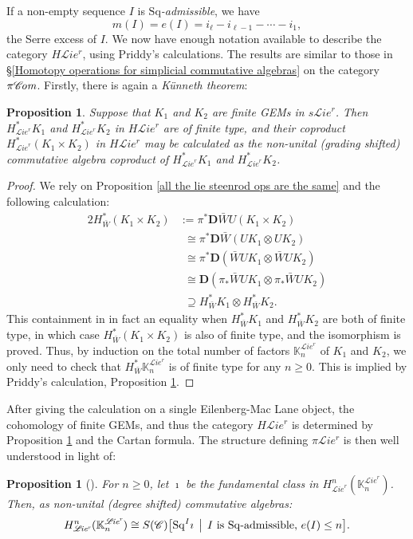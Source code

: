\documentclass[11pt]{amsart} \renewcommand{\baselinestretch}{1.2}
\theoremstyle{plain}
\newtheorem{prop}[thm]{Proposition}
\numberwithin{equation}{section} %
\theoremstyle{plain}
\newtheorem{prop}[thm]{Proposition}
\numberwithin{equation}{chapter} %
\newcommand{\scrL}{\mathscr{L}}
\newcommand{\scrC}{\mathscr{C}}
\newcommand{\citeBOX}[2][]{\cite[\mbox{#1}]{#2}}
\newcommand{\CommOperad}{{\scrC}}
\newcommand{\PA}[1]{\pi#1}
\newcommand{\HA}[1]{H#1}
\newcommand{\minDimDelta}{m}
\newcommand{\Sq}{\mathrm{Sq}}
\newcommand{\algs}{{\scrC\!\textit{\normalfont\textit{om}}}}
\newcommand{\restliealgs}{{\scrL\!\textit{ie}^\textit{r}}}
\newcommand{\dual}{\mathbf{D}}
\begin{document}
\begin{Constructing cohomology operations}
If a non-empty sequence $I$  is \emph{$\Sq$-admissible}, we have 
\[\minDimDelta(I)=e(I)=i_\ell-i_{\ell-1}-\cdots -i_1,\]
the Serre excess of $I$. We now have enough notation available to describe the category $\HA{\restliealgs}$, using Priddy's calculations. The results are similar to those in \S\ref{Homotopy operations for simplicial commutative algebras} on the category $\PA{\algs}$.
Firstly, there is again  a \emph{K\"unneth theorem}:
\begin{prop}
\label{Prop on cohomology of product of finite lie gems}
Suppose that $K_1$ and $K_2$ are finite GEMs in $s\restliealgs$. Then $H^*_\restliealgs K_1$ and $H^*_\restliealgs K_2$ in $\HA{\restliealgs}$ are of finite type, and their coproduct
$H^*_\restliealgs(K_1\times K_2)$ in $\HA{\restliealgs}$ may be calculated as the non-unital (grading shifted) commutative algebra coproduct of $H^*_\restliealgs K_1$ and $H^*_\restliealgs K_2$.
\end{prop}
\begin{proof}
We rely on Proposition \ref{all the lie steenrod ops are the same} and the following calculation:
\begin{alignat*}{2}
H^*_{\bar{W}}(K_1\times K_2)
&:=
\pi^*\dual \bar{W}U(K_1\times K_2)%
\\
&\phantom{:}\cong
\pi^*\dual \bar{W}(UK_1\otimes UK_2)%
\\
&\phantom{:}\cong
\pi^*\dual (\bar{W}UK_1\otimes \bar{W}UK_2)%
\\
&\phantom{:}\cong
\dual (\pi_*\bar{W}UK_1\otimes \pi_*\bar{W}UK_2)%
\\
&\phantom{:}\supseteq
H^*_{\bar{W}}K_1\otimes H^*_{\bar{W}}K_2.
\end{alignat*}
This containment in in fact an equality when $H^*_{\bar{W}}K_1 $ and $H^*_{\bar{W}}K_2$ are both of finite type, in which case $H^*_{\bar{W}}(K_1\times K_2)$ is also of finite type, and the isomorphism is proved. Thus, by induction on the total number of factors $\mathbb{K}_n^{\restliealgs}$ of $K_1$ and $K_2$, we only need to check that $H^*_{\bar{W}}\mathbb{K}_n^{\restliealgs}$ is of finite type for any $n\geq0$. This is implied by Priddy's calculation, Proposition \ref{calc of restliecoh on single EMobject}.
\end{proof}
\noindent After giving the calculation on a single Eilenberg-Mac Lane object, the cohomology of finite GEMs, and thus the category $\HA{\restliealgs}$ is determined by Proposition \ref{Prop on cohomology of product of finite lie gems} and the Cartan formula. The structure defining $\PA{\restliealgs}$ is then well understood in light of:
\begin{prop}[{\citeBOX[6.1]{PriddySimplicialLie.pdf}}]
\label{calc of restliecoh on single EMobject}
For $n\geq0$, let $\imath$ be the fundamental class in $H^n_{\restliealgs}(\mathbb{K}_n^{\restliealgs})$. Then, as non-unital (degree shifted) commutative algebras:
\[H^n_{\restliealgs}(\mathbb{K}_n^{\restliealgs})\cong S(\CommOperad)\bigl[\Sq^I\imath\,\bigm|\,\textup{$I$ is $\Sq$-admissible, $e(I)\leq n$}\bigr].\]
\end{prop}


\end{Constructing cohomology operations}
\end{document}
